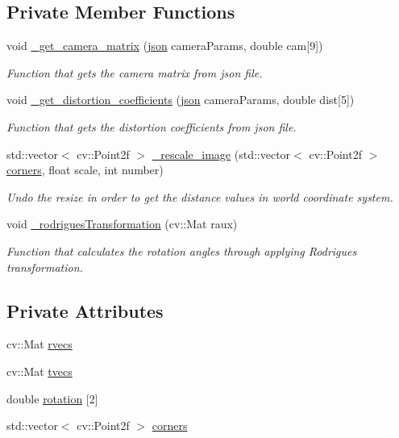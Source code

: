 \subsection*{Private Member Functions}
\begin{DoxyCompactItemize}
\item 
void \hyperlink{class_pose_estimation_a965906535e05ba20e70b2f3a27ca5257}{\+\_\+get\+\_\+camera\+\_\+matrix} (\hyperlink{_json_utilization_8h_ab701e3ac61a85b337ec5c1abaad6742d}{json} camera\+Params, double cam\mbox{[}9\mbox{]})
\begin{DoxyCompactList}\small\item\em Function that gets the camera matrix from json file. \end{DoxyCompactList}\item 
void \hyperlink{class_pose_estimation_a612cfe658e71f673cb834c9257541a17}{\+\_\+get\+\_\+distortion\+\_\+coefficients} (\hyperlink{_json_utilization_8h_ab701e3ac61a85b337ec5c1abaad6742d}{json} camera\+Params, double dist\mbox{[}5\mbox{]})
\begin{DoxyCompactList}\small\item\em Function that gets the distortion coefficients from json file. \end{DoxyCompactList}\item 
std\+::vector$<$ cv\+::\+Point2f $>$ \hyperlink{class_pose_estimation_a3c5cee6eed85be0e4b4d69e6763584ae}{\+\_\+rescale\+\_\+image} (std\+::vector$<$ cv\+::\+Point2f $>$ \hyperlink{class_pose_estimation_a2cfe879dc7fe7841709b3e22d306f7c0}{corners}, float scale, int number)
\begin{DoxyCompactList}\small\item\em Undo the resize in order to get the distance values in world coordinate system. \end{DoxyCompactList}\item 
void \hyperlink{class_pose_estimation_a446ca032027332f9310e97ed5f986528}{\+\_\+rodrigues\+Transformation} (cv\+::\+Mat raux)
\begin{DoxyCompactList}\small\item\em Function that calculates the rotation angles through applying Rodrigues transformation. \end{DoxyCompactList}\end{DoxyCompactItemize}
\subsection*{Private Attributes}
\begin{DoxyCompactItemize}
\item 
cv\+::\+Mat \hyperlink{class_pose_estimation_a58c73c54cbdab59e168f1645c6cba239}{rvecs}
\item 
cv\+::\+Mat \hyperlink{class_pose_estimation_a60141045de99ad2f8b9c87471a198afe}{tvecs}
\item 
double \hyperlink{class_pose_estimation_a6f4078b9cf03b4dbee49cfcd32bc0b07}{rotation} \mbox{[}2\mbox{]}
\item 
std\+::vector$<$ cv\+::\+Point2f $>$ \hyperlink{class_pose_estimation_a2cfe879dc7fe7841709b3e22d306f7c0}{corners}
\end{DoxyCompactItemize}


